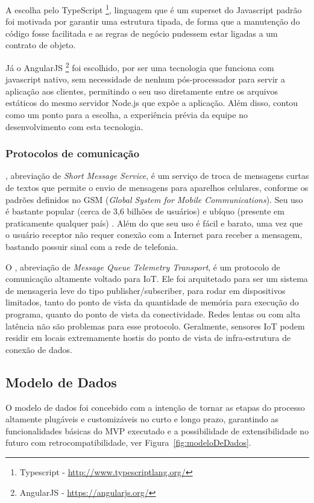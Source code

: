 A escolha pelo TypeScript \footnote{Typescript - \url{http://www.typescriptlang.org/}}, linguagem que é um superset do Javascript padrão foi motivada por garantir uma estrutura tipada, de forma que a manutenção do código fosse facilitada e as regras de negócio pudessem estar ligadas a um contrato de objeto.

Já o AngularJS \footnote{AngularJS - \url{https://angularjs.org/}} foi escolhido, por ser uma tecnologia que funciona com javascript nativo, sem necessidade de nenhum pós-processador para servir a aplicação aos clientes, permitindo o seu uso diretamente entre os arquivos estáticos do mesmo servidor Node.js que expõe a aplicação. Além disso, contou como um ponto para a escolha, a experiência prévia da equipe no desenvolvimento com esta tecnologia.

\subsubsection{Protocolos de comunicação}
\label{protocolos}

\label{sms}, abreviação de \textit{Short Message Service}, é um serviço de troca de mensagens curtas de textos que permite o envio de mensagens para aparelhos celulares, conforme os padrões definidos no GSM (\textit{Global System for Mobile Communications}). Seu uso é bastante popular (cerca de 3,6 bilhões de usuários) \cite{SMS} e ubíquo (presente em praticamente qualquer país) \cite{SMSItu}. Além do que seu uso é fácil e barato, uma vez que o usuário receptor não requer conexão com a Internet para receber a mensagem, bastando possuir sinal com a rede de telefonia.

O \label{mqtt}, abreviação de \textit{Message Queue Telemetry Transport}, é um protocolo de comunicação altamente voltado para IoT. Ele foi arquitetado para ser um sistema de mensageria leve do tipo publisher/subscriber, para rodar em dispositivos limitados, tanto do ponto de vista da quantidade de memória para execução do programa, quanto do ponto de vista da conectividade. Redes lentas ou com alta latência não são problemas para esse protocolo. Geralmente, sensores IoT podem residir em locais extremamente hostis do ponto de vista de infra-estrutura de conexão de dados.



\subsection{Modelo de Dados}
O modelo de dados foi concebido com a intenção de tornar as etapas do processo altamente plugáveis e customizáveis no curto e longo prazo, garantindo as funcionalidades básicas do MVP \cite{MVP} executado e a possibilidade de extensibilidade no futuro com retrocompatibilidade, ver Figura~\ref{fig:modeloDeDados}.

